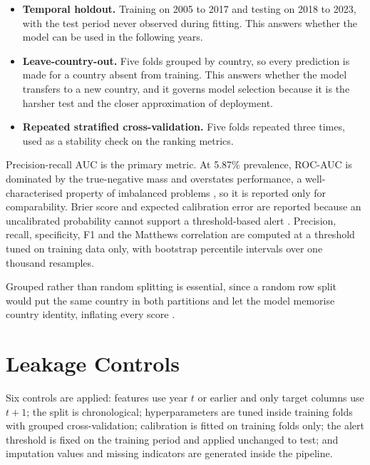 \documentclass[10pt,openany]{report}
\begin{document}
\begin{itemize}
  \item \textbf{Temporal holdout.} Training on 2005 to 2017 and testing on 2018 to 2023, with the
        test period never observed during fitting. This answers whether the model can be used in
        the following years.
  \item \textbf{Leave-country-out.} Five folds grouped by country, so every prediction is made for
        a country absent from training. This answers whether the model transfers to a new country,
        and it governs model selection because it is the harsher test and the closer
        approximation of deployment.
  \item \textbf{Repeated stratified cross-validation.} Five folds repeated three times, used as a
        stability check on the ranking metrics.
\end{itemize}

Precision-recall AUC is the primary metric. At 5.87\% prevalence, ROC-AUC is dominated by the
true-negative mass and overstates performance, a well-characterised property of imbalanced problems
\cite{saito2015,davis2006}, so it is reported only for comparability. Brier score and expected
calibration error are reported because an uncalibrated probability cannot support a threshold-based
alert \cite{niculescu2005,huang2020}. Precision, recall, specificity, F1 and the Matthews
correlation are computed at a threshold tuned on training data only, with bootstrap percentile
intervals over one thousand resamples.

Grouped rather than random splitting is essential, since a random row split would put the same
country in both partitions and let the model memorise country identity, inflating every score
\cite{roberts2017}.

\section{Leakage Controls}

Six controls are applied: features use year $t$ or earlier and only target columns use $t+1$; the
split is chronological; hyperparameters are tuned inside training folds with grouped
cross-validation; calibration is fitted on training folds only; the alert threshold is fixed on the
training period and applied unchanged to test; and imputation values and missing indicators are
generated inside the pipeline.

\end{document}
